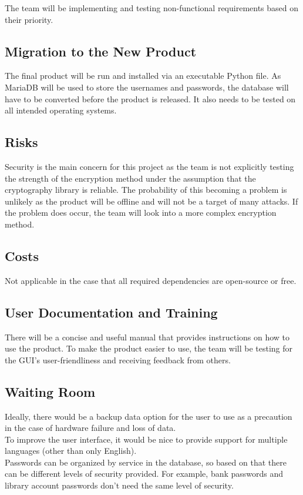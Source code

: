 \documentclass[12pt, titlepage]{article}
\begin{document}
The team will be implementing and testing non-functional requirements based on their priority.

\subsection{Migration to the New Product}

The final product will be run and installed via an executable Python file. As MariaDB will be used to store the usernames and passwords, the database will have to be converted before the product is released. It also needs to be tested on all intended operating systems.

\subsection{Risks}

Security is the main concern for this project as the team is not explicitly testing the strength of the encryption method under the assumption that the cryptography library is reliable. The probability of this becoming a problem is unlikely as the product will be offline and will not be a target of many attacks. If the problem does occur, the team will look into a more complex encryption method. 

\subsection{Costs}

Not applicable in the case that all required dependencies are open-source or free.

\subsection{User Documentation and Training}

There will be a concise and useful manual that provides instructions on how to use the product. To make the product easier to use, the team will be testing for the GUI’s user-friendliness and receiving feedback from others. 

\subsection{Waiting Room}

Ideally, there would be a backup data option for the user to use as a precaution in the case of hardware 
failure and loss of data.
\\
To improve the user interface, it would be nice to provide support for multiple languages (other than only English).
\\
Passwords can be organized by service in the database, so based on that there can be different levels of security provided. For example, bank passwords and library account passwords don’t need the same level of security.
\end{document}
